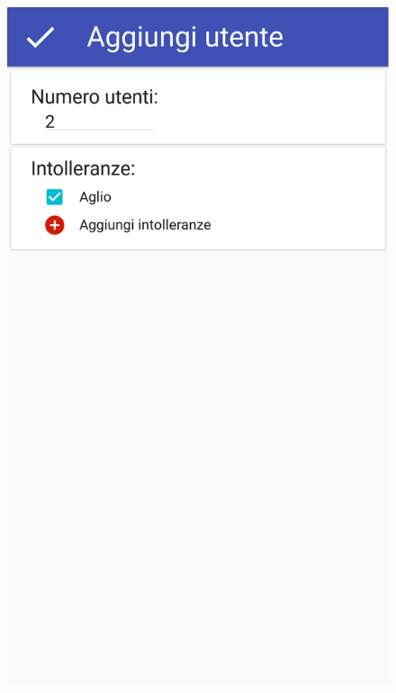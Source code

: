 \begin{figure}[H]
	\begin{minipage}{.49\textwidth}
		\includegraphics[width=\textwidth]{img/wireframe/aggiungi_utente_generico_ok.png}
	\end{minipage}
	\begin{minipage}{.49\textwidth}

\end{minipage}
\end{figure}
